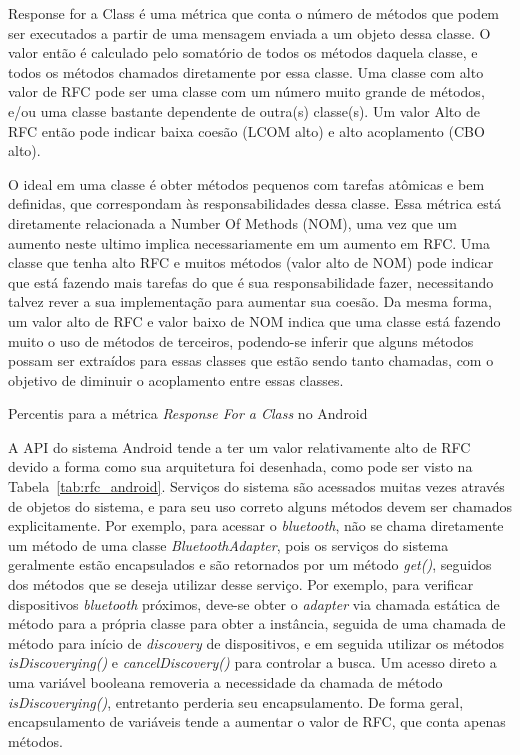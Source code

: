 Response for a Class é uma métrica que conta o número de métodos que podem ser executados a partir de uma mensagem enviada a um objeto dessa classe. O valor então é calculado pelo somatório de todos os métodos daquela classe, e todos os métodos chamados diretamente por essa classe. Uma classe com alto valor de RFC pode ser uma classe com um número muito grande de métodos, e/ou uma classe bastante dependente de outra(s) classe(s). Um valor Alto de RFC então pode indicar baixa coesão (LCOM alto) e alto acoplamento (CBO alto). 

O ideal em uma classe é obter métodos pequenos com tarefas atômicas e bem definidas, que correspondam às responsabilidades dessa classe. Essa métrica está diretamente relacionada a Number Of Methods (NOM), uma vez que um aumento neste ultimo implica necessariamente em um aumento em RFC. Uma classe que tenha alto RFC e muitos métodos (valor alto de NOM) pode indicar que está fazendo mais tarefas do que é sua responsabilidade fazer, necessitando talvez rever a sua implementação para aumentar sua coesão. Da mesma forma, um valor alto de RFC e valor baixo de NOM indica que uma classe está fazendo muito o uso de métodos de terceiros, podendo-se inferir que alguns métodos possam ser extraídos para essas classes que estão sendo tanto chamadas, com o objetivo de diminuir o acoplamento entre essas classes.

\begin{table}[!htb]

\caption{Percentis para a métrica \textit{Response For a Class} no Android}
\label{tab:rfc_android}
\end{table}

A API do sistema Android tende a ter um valor relativamente alto de RFC devido a forma como sua arquitetura foi desenhada, como pode ser visto na Tabela~\ref{tab:rfc_android}. Serviços do sistema são acessados muitas vezes através de objetos do sistema, e para seu uso correto alguns métodos devem ser chamados explicitamente. Por exemplo, para acessar o \textit{bluetooth}, não se chama diretamente um método de uma classe \textit{BluetoothAdapter}, pois os serviços do sistema geralmente estão encapsulados e são retornados por um método \textit{get()}, seguidos dos métodos que se deseja utilizar desse serviço. Por exemplo, para verificar dispositivos \textit{bluetooth} próximos, deve-se obter o \textit{adapter} via chamada estática de método para a própria classe para obter a instância, seguida de uma chamada de método para início de \textit{discovery} de dispositivos, e em seguida utilizar os métodos \textit{isDiscoverying()} e \textit{cancelDiscovery()} para controlar a busca. Um acesso direto a uma variável booleana removeria a necessidade da chamada de método \textit{isDiscoverying()}, entretanto perderia seu encapsulamento. De forma geral, encapsulamento de variáveis tende a aumentar o valor de RFC, que conta apenas métodos. 

